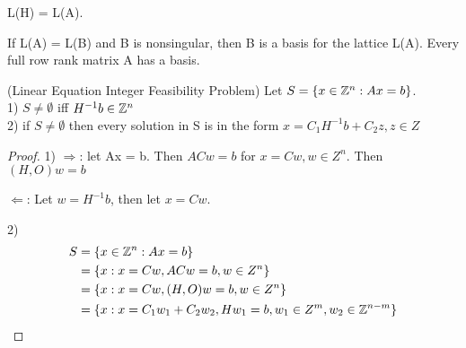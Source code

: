 \begin{corollary}
L(H) = L(A).
\end{corollary}



\begin{definition}
If L(A)  = L(B) and B is nonsingular, then B is a basis for the lattice L(A). Every full row rank matrix A has a basis.
\end{definition}



\begin{theorem}(Linear Equation Integer Feasibility Problem)
Let $S = \{x \in \mathbb Z^n : Ax = b\}$. \\ 1) $S \neq \emptyset$ iff $H^{-1}b \in \mathbb Z^n$ \\ 2) if $S \neq \emptyset$ then every solution in S is in the form $x = C_1H^{-1}b + C_2z, z \in Z$
\end{theorem}

\begin{proof}
1) $\Rightarrow$: let Ax = b. Then $ACw = b$ for $x = Cw, w \in Z^n$. Then $(H,O)w = b$

$\Leftarrow$: Let $w =  H^{-1}b$, then let $x = Cw$.

2)  \begin{align*}
	S &= \{x \in \mathbb Z^n : Ax = b\} \\
	   &= \{x: x = Cw, ACw = b, w \in Z^n \} \\
	   &= \{x: x = Cw, (H,O)w = b, w \in Z^n \} \\
	   &= \{x: x = C_1w_1 + C_2w_2, Hw_1 = b, w_1 \in Z^m, w_2 \in \mathbb Z^{n-m}  \}
\end{align*}
\end{proof}


